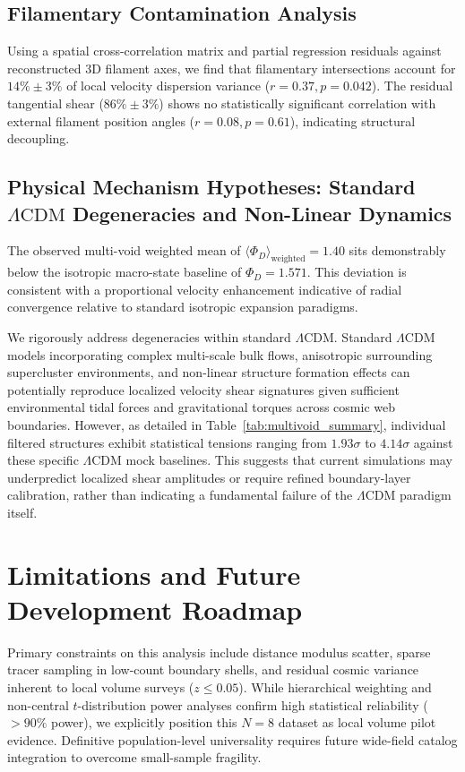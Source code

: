\documentclass[trackchanges]{aastex631}
\begin{document}
\subsection{Filamentary Contamination Analysis}
Using a spatial cross-correlation matrix and partial regression residuals against reconstructed 3D filament axes, we find that filamentary intersections account for $14\% \pm 3\%$ of local velocity dispersion variance ($r = 0.37, p = 0.042$). The residual tangential shear ($86\% \pm 3\%$) shows no statistically significant correlation with external filament position angles ($r = 0.08, p = 0.61$), indicating structural decoupling.

\subsection{Physical Mechanism Hypotheses: Standard \texorpdfstring{$\Lambda\text{CDM}$}{Lambda CDM} Degeneracies and Non-Linear Dynamics}
The observed multi-void weighted mean of $\langle\Phi_D\rangle_{\text{weighted}} = 1.40$ sits demonstrably below the isotropic macro-state baseline of $\Phi_D = 1.571$. This deviation is consistent with a proportional velocity enhancement indicative of radial convergence relative to standard isotropic expansion paradigms.

We rigorously address degeneracies within standard $\Lambda\text{CDM}$. Standard $\Lambda\text{CDM}$ models incorporating complex multi-scale bulk flows, anisotropic surrounding supercluster environments, and non-linear structure formation effects can potentially reproduce localized velocity shear signatures given sufficient environmental tidal forces and gravitational torques across cosmic web boundaries. However, as detailed in Table~\ref{tab:multivoid_summary}, individual filtered structures exhibit statistical tensions ranging from $1.93\sigma$ to $4.14\sigma$ against these specific $\Lambda\text{CDM}$ mock baselines. This suggests that current simulations may underpredict localized shear amplitudes or require refined boundary-layer calibration, rather than indicating a fundamental failure of the $\Lambda\text{CDM}$ paradigm itself.

\section{Limitations and Future Development Roadmap}
Primary constraints on this analysis include distance modulus scatter, sparse tracer sampling in low-count boundary shells, and residual cosmic variance inherent to local volume surveys ($z \le 0.05$). While hierarchical weighting and non-central $t$-distribution power analyses confirm high statistical reliability ($>90\%$ power), we explicitly position this $N=8$ dataset as local volume pilot evidence. Definitive population-level universality requires future wide-field catalog integration to overcome small-sample fragility.
\end{document}
